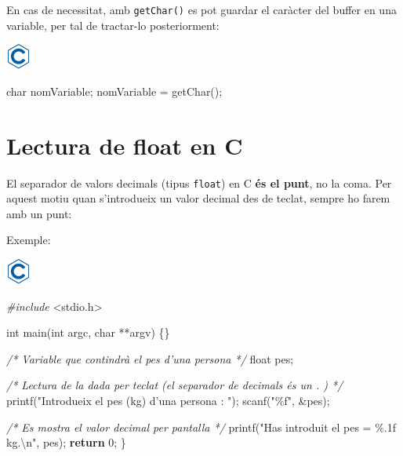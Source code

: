 \documentclass[]{book}
\newenvironment{Shaded}{\begin{snugshade}}{\end{snugshade}}
\newcommand{\CommentTok}[1]{\textcolor[rgb]{0.56,0.35,0.01}{\textit{#1}}}
\newcommand{\ControlFlowTok}[1]{\textcolor[rgb]{0.13,0.29,0.53}{\textbf{#1}}}
\newcommand{\DataTypeTok}[1]{\textcolor[rgb]{0.13,0.29,0.53}{#1}}
\newcommand{\DecValTok}[1]{\textcolor[rgb]{0.00,0.00,0.81}{#1}}
\newcommand{\ImportTok}[1]{#1}
\newcommand{\NormalTok}[1]{#1}
\newcommand{\PreprocessorTok}[1]{\textcolor[rgb]{0.56,0.35,0.01}{\textit{#1}}}
\newcommand{\SpecialCharTok}[1]{\textcolor[rgb]{0.00,0.00,0.00}{#1}}
\newcommand{\StringTok}[1]{\textcolor[rgb]{0.31,0.60,0.02}{#1}}
\begin{document}
En cas de necessitat, amb \texttt{getChar()} es pot guardar el caràcter del buffer en una variable, per tal de tractar-lo posteriorment:

\includegraphics{./img/c.png}

\begin{Shaded}
\begin{Highlighting}[]
\DataTypeTok{char}\NormalTok{ nomVariable;}
\NormalTok{nomVariable = getChar();}
\end{Highlighting}
\end{Shaded}

\hypertarget{lectura-de-float-en-c}{%
\section{Lectura de float en C}\label{lectura-de-float-en-c}}

El separador de valors decimals (tipus \texttt{float}) en C \textbf{és el punt}, no la coma. Per aquest motiu quan s'introdueix un valor decimal des de teclat, sempre ho farem amb un punt:

Exemple:

\includegraphics{./img/c.png}

\begin{Shaded}
\begin{Highlighting}[]
\PreprocessorTok{\#include }\ImportTok{\textless{}stdio.h\textgreater{}}

\DataTypeTok{int}\NormalTok{ main(}\DataTypeTok{int}\NormalTok{ argc, }\DataTypeTok{char}\NormalTok{ **argv) \{\}}

    \CommentTok{/* Variable que contindrà el pes d’una persona */}
    \DataTypeTok{float}\NormalTok{ pes;}

    \CommentTok{/* Lectura de la dada per teclat (el separador de decimals és un . ) */}
\NormalTok{    printf(}\StringTok{"Introdueix el pes (kg) d’una persona : "}\NormalTok{);}
\NormalTok{    scanf(}\StringTok{"\%f"}\NormalTok{, \&pes);}

   \CommentTok{/* Es mostra el valor decimal per pantalla */}
\NormalTok{   printf(}\StringTok{"Has introduit el pes = \%.1f kg.}\SpecialCharTok{\textbackslash{}n}\StringTok{"}\NormalTok{, pes);}
   \ControlFlowTok{return} \DecValTok{0}\NormalTok{;}
\NormalTok{\}}
\end{Highlighting}
\end{Shaded}
\end{document}
